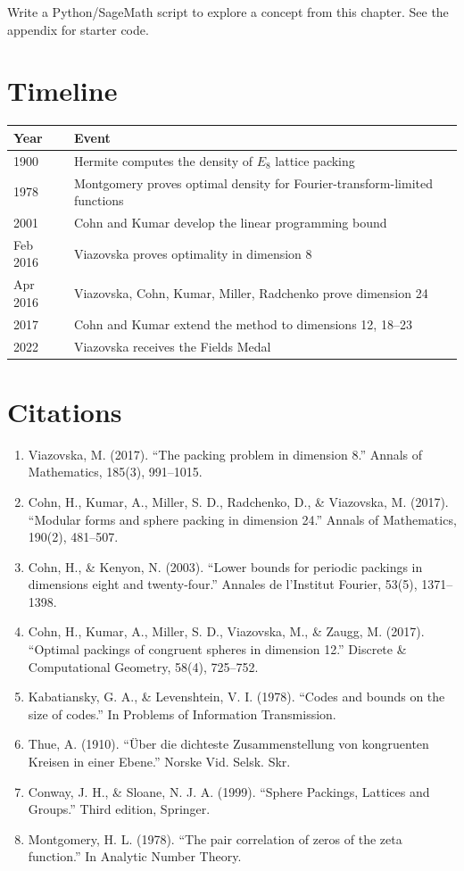 \begin{exercise}[Computational]
Write a Python/SageMath script to explore a concept from this chapter. See the appendix for starter code.
\end{exercise}

\section{Timeline}

\begin{tabularx}{\linewidth}{lX}
\toprule
\textbf{Year} & \textbf{Event} \\ \midrule
1900 & Hermite computes the density of $E_8$ lattice packing \\ 
1978 & Montgomery proves optimal density for Fourier-transform-limited functions \cite{montgomery1978} \\ 
2001 & Cohn and Kumar develop the linear programming bound \cite{cohn2003} \\ 
Feb 2016 & Viazovska proves optimality in dimension 8 \cite{viazovska2017} \\ 
Apr 2016 & Viazovska, Cohn, Kumar, Miller, Radchenko prove dimension 24 \cite{cohn2017} \\ 
2017 & Cohn and Kumar extend the method to dimensions 12, 18--23 \cite{cohn2017b} \\ 
2022 & Viazovska receives the Fields Medal \\ \bottomrule
\end{tabularx}

\section{Citations}

\begin{enumerate}
\item Viazovska, M. (2017). ``The packing problem in dimension 8.'' Annals of Mathematics, 185(3), 991--1015.
\item Cohn, H., Kumar, A., Miller, S. D., Radchenko, D., \& Viazovska, M. (2017). ``Modular forms and sphere packing in dimension 24.'' Annals of Mathematics, 190(2), 481--507.
\item Cohn, H., \& Kenyon, N. (2003). ``Lower bounds for periodic packings in dimensions eight and twenty-four.'' Annales de l'Institut Fourier, 53(5), 1371--1398.
\item Cohn, H., Kumar, A., Miller, S. D., Viazovska, M., \& Zaugg, M. (2017). ``Optimal packings of congruent spheres in dimension 12.'' Discrete \& Computational Geometry, 58(4), 725--752.
\item Kabatiansky, G. A., \& Levenshtein, V. I. (1978). ``Codes and bounds on the size of codes.'' In Problems of Information Transmission.
\item Thue, A. (1910). ``\"{U}ber die dichteste Zusammenstellung von kongruenten Kreisen in einer Ebene.'' Norske Vid. Selsk. Skr.
\item Conway, J. H., \& Sloane, N. J. A. (1999). ``Sphere Packings, Lattices and Groups.'' Third edition, Springer.
\item Montgomery, H. L. (1978). ``The pair correlation of zeros of the zeta function.'' In Analytic Number Theory.
\end{enumerate}